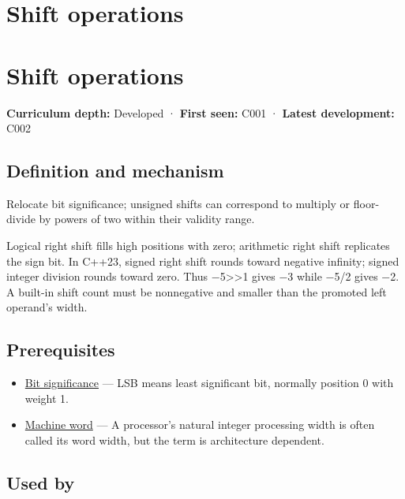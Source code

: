\hypertarget{appendix-73425b25118e}{}
\section*{Shift operations}
\section{Shift operations}\label{appendix-73425b25118e-shift-operations}

\textbf{Curriculum depth:} Developed · \textbf{First seen:} C001 · \textbf{Latest development:} C002

\subsection{Definition and mechanism}\label{appendix-73425b25118e-definition-and-mechanism}

Relocate bit significance; unsigned shifts can correspond to multiply or floor-divide by powers of two within their validity range.

Logical right shift fills high positions with zero; arithmetic right shift replicates the sign bit. In C++23, signed right shift rounds toward negative infinity; signed integer division rounds toward zero. Thus −5\textgreater\textgreater1 gives −3 while −5/2 gives −2. A built-in shift count must be nonnegative and smaller than the promoted left operand's width.

\subsection{Prerequisites}\label{appendix-73425b25118e-prerequisites}

\begin{itemize}
\tightlist
\item
  \hyperref[appendix-280445746493]{Bit significance} --- LSB means least significant bit, normally position 0 with weight 1.
\item
  \hyperref[appendix-d67a19507dc5]{Machine word} --- A processor's natural integer processing width is often called its word width, but the term is architecture dependent.
\end{itemize}

\subsection{Used by}\label{appendix-73425b25118e-used-by}

